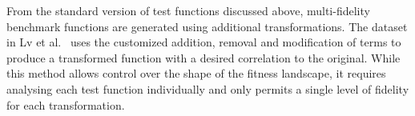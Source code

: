

From the standard version of test functions discussed above, multi-fidelity benchmark functions are generated using additional transformations. The dataset in Lv et al.~\cite{lv2021multi} uses the customized addition, removal and modification of terms to produce a transformed function with a desired correlation to the original.
While this method allows control over the shape of the fitness landscape, it requires analysing each test function individually and only permits a single level of fidelity for each transformation.

